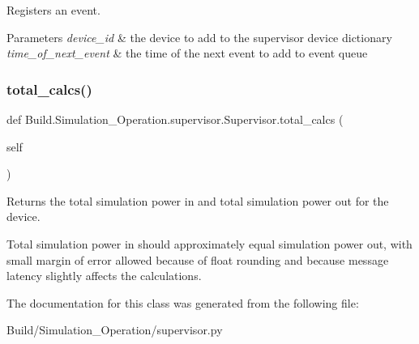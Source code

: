 Registers an event. 


\begin{DoxyParams}{Parameters}
{\em device\+\_\+id} & the device to add to the supervisor device dictionary \\
\hline
{\em time\+\_\+of\+\_\+next\+\_\+event} & the time of the next event to add to event queue \\
\hline
\end{DoxyParams}
\mbox{\label{class_build_1_1_simulation___operation_1_1supervisor_1_1_supervisor_a27f0aa77cedb9b74d8d8d93ab702b01a}} 
\subsubsection{\texorpdfstring{total\+\_\+calcs()}{total\_calcs()}}
{\footnotesize\ttfamily def Build.\+Simulation\+\_\+\+Operation.\+supervisor.\+Supervisor.\+total\+\_\+calcs (\begin{DoxyParamCaption}\item[{}]{self }\end{DoxyParamCaption})}



Returns the total simulation power in and total simulation power out for the device. 

Total simulation power in should approximately equal simulation power out, with small margin of error allowed because of float rounding and because message latency slightly affects the calculations. 

The documentation for this class was generated from the following file\+:\begin{DoxyCompactItemize}
\item 
Build/\+Simulation\+\_\+\+Operation/supervisor.\+py\end{DoxyCompactItemize}
